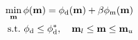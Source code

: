 \begin{equation}
\begin{split}
    \min_{\mathbf{m}} \phi(\mathbf{m}) = \phi_{\rm d}(\mathbf{m}) + \beta \phi_{\rm m}(\mathbf{m}) \\
    \text{s.t.} ~\phi_{\rm d} \leq \phi_{\rm d}^*, \quad \mathbf{m}_l \leq \mathbf{m} \leq \mathbf{m}_u
\end{split}
\label{eq:inv-prob}
\end{equation}
